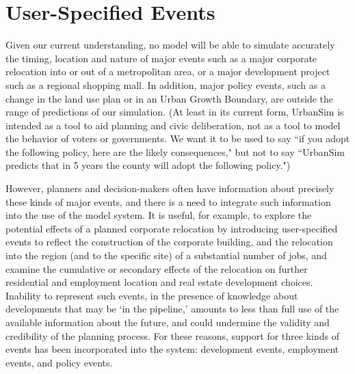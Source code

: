 \section{User-Specified Events}

Given our current understanding, no model will be able to simulate
accurately the timing, location and nature of major events such as
a major corporate relocation into or out of a metropolitan area,
or a major development project such as a regional shopping mall.
In addition, major policy events, such as a change in the land use
plan or in an Urban Growth Boundary, are outside the range of
predictions of our simulation.  (At least in its current form,
UrbanSim is intended as a tool to aid planning and civic
deliberation, not as a tool to model the behavior of voters or
governments.  We want it to be used to say ``if you adopt the
following policy, here are the likely consequences," but not to
say ``UrbanSim predicts that in 5 years the county will adopt the
following policy.")

However, planners and decision-makers often have information about
precisely these kinds of major events, and there is a need to
integrate such information into the use of the model system.  It
is useful, for example, to explore the potential effects of a
planned corporate relocation by introducing user-specified events
to reflect the construction of the corporate building, and the
relocation into the region (and to the specific site) of a
substantial number of jobs, and examine the cumulative or
secondary effects of the relocation on further residential and
employment location and real estate development choices. Inability
to represent such events, in the presence of knowledge about
developments that may be `in the pipeline,' amounts to less than
full use of the available information about the future, and could
undermine the validity and credibility of the planning process.
For these reasons, support for three kinds of events has been
incorporated into the system: development events, employment
events, and policy events.

